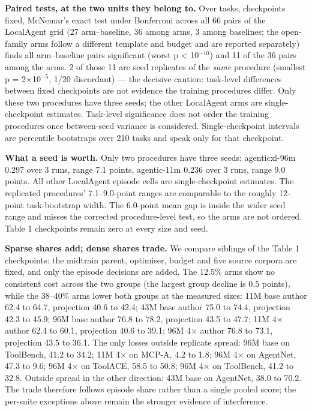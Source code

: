 \documentclass{article}
\begin{document}
\textbf{Paired tests, at the two units they belong to.} Over tasks, checkpoints fixed, McNemar's exact test under Bonferroni across all 66 pairs of the LocalAgent grid (27 arm--baseline, 36 among arms, 3 among baselines; the open-family arms follow a different template and budget and are reported separately) finds all arm--baseline pairs significant (worst p < 10$^{-10}$) and 11 of the 36 pairs among the arms. 2 of those 11 are seed replicates of the \emph{same} procedure (smallest p = 2$\times$10$^{-5}$, 1/20 discordant) --- the decisive caution: task-level differences between fixed checkpoints are not evidence the training procedures differ. Only these two procedures have three seeds; the other LocalAgent arms are single-checkpoint estimates. Task-level significance does not order the training procedures once between-seed variance is considered. Single-checkpoint intervals are percentile bootstraps over 210 tasks and speak only for that checkpoint.


\textbf{What a seed is worth.} Only two procedures have three seeds: agenticxl-96m 0.297 over 3 runs, range 7.1 points, agentic-11m 0.236 over 3 runs, range 9.0 points. All other LocalAgent episode cells are single-checkpoint estimates. The replicated procedures' 7.1--9.0-point ranges are comparable to the roughly 12-point task-bootstrap width. The 6.0-point mean gap is inside the wider seed range and misses the corrected procedure-level test, so the arms are not ordered. Table 1 checkpoints remain zero at every size and seed.


\textbf{Sparse shares add; dense shares trade.} We compare siblings of the Table 1 checkpoints: the midtrain parent, optimiser, budget and five source corpora are fixed, and only the episode decisions are added. The 12.5\% arms show no consistent cost across the two groups (the largest group decline is 0.5 points), while the 38--40\% arms lower both groups at the measured sizes: 11M base author 62.4 to 64.7, projection 40.6 to 42.4; 43M base author 75.0 to 74.4, projection 42.3 to 45.9; 96M base author 76.8 to 78.2, projection 43.5 to 47.7; 11M 4$\times$ author 62.4 to 60.1, projection 40.6 to 39.1; 96M 4$\times$ author 76.8 to 73.1, projection 43.5 to 36.1. The only losses outside replicate spread: 96M base on ToolBench, 41.2 to 34.2; 11M 4$\times$ on MCP-A, 4.2 to 1.8; 96M 4$\times$ on AgentNet, 47.3 to 9.6; 96M 4$\times$ on ToolACE, 58.5 to 50.8; 96M 4$\times$ on ToolBench, 41.2 to 32.8. Outside spread in the other direction: 43M base on AgentNet, 38.0 to 70.2. The trade therefore follows episode share rather than a single pooled score; the per-suite exceptions above remain the stronger evidence of interference.
\end{document}
